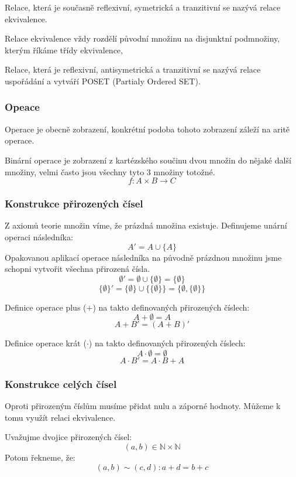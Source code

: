 \begin{definition}
	Relace, která je současně reflexivní, symetrická a
	tranzitivní se nazývá relace ekvivalence.

	Relace ekvivalence vždy rozdělí původní množinu na disjunktní podmnožiny,
	kterým říkáme třídy ekvivalence,
\end{definition}

\begin{definition}
	Relace, která je reflexivní, antisymetrická a tranzitivní se nazývá
	relace uspořádání a vytváří POSET (Partialy Ordered SET).
\end{definition}


\subsubsection*{Opeace}
Operace je obecně zobrazení, konkrétní podoba tohoto zobrazení záleží na aritě operace.

Binární operace je zobrazení z kartézského součinu dvou množin do nějaké další množiny, velmi často
jsou všechny tyto 3 množiny totožné.
$$f: A \times B \rightarrow C$$

\subsubsection*{Konstrukce přirozených čísel}
Z axiomů teorie množin víme, že prázdná množina existuje. Definujeme unární operaci
následníka:
$$A' = A \cup \{A\}$$
Opakovanou aplikací operace následníka na původně prázdnou množinu jsme schopni vytvořit
všechna přirozená čísla.
$$\emptyset' = \emptyset \cup \{\emptyset\} = \{\emptyset\}$$
$$\{\emptyset\}' = \{\emptyset\} \cup \{\{\emptyset\}\} = \{\emptyset, \{\emptyset\}\}$$

Definice operace plus ($+$) na takto definovaných přirozených číslech:
$$A + \emptyset = A$$
$$A + B' = (A+B)'$$

Definice operace krát ($\cdot$) na takto definovaných přirozených číslech:
$$A \cdot \emptyset = \emptyset$$
$$A \cdot B' = A \cdot B + A$$

\subsubsection*{Konstrukce celých čísel}
Oproti přirozeným číslům musíme přidat nulu a záporné hodnoty. Můžeme k tomu
využít relaci ekvivalence.

Uvažujme dvojice přirozených čísel:
$$(a, b) \in \mathbb{N} \times \mathbb{N}$$
Potom řekneme, že:
$$(a, b) \sim (c, d): a + d = b + c$$

